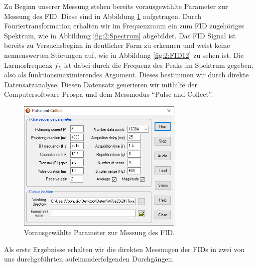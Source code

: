 \documentclass[../../main.tex]{subfiles}
\begin{document}
    Zu Beginn unserer Messung stehen bereits vorausgewählte Parameter zur Messung des FID. Diese sind in Abbildung \ref{fig:2:Parameter} aufgetragen. Durch Fouriertransformation erhalten wir im Frequenzraum ein zum FID zugehöriges Spektrum, wie in Abbildung \ref{fig:2:Spectrum} abgebildet. Das FID Signal ist bereits zu Versuchsbeginn in deutlicher Form zu erkennen und weist keine nennenswerten Störungen auf, wie in Abbildung \ref{fig:2:FID12} zu sehen ist. Die Larmorfrequenz $f_L$ ist dabei durch die Frequenz des Peaks im Spektrum gegeben, also als funktionsmaximierendes Argument. Dieses bestimmen wir durch direkte Datensatzanalyse. Diesen Datensatz generieren wir mithilfe der Computersoftware Prospa und dem Messmodus \enquote{Pulse and Collect}. 
    \begin{figure}[H]
        \centering
        \includegraphics[width=8cm]{Bilddateien/2/Exp1_Parameter.PNG}
        \caption{Vorausgewählte Parameter zur Messung des FID.}
        \label{fig:2:Parameter}
    \end{figure}
    Als erste Ergebnisse erhalten wir die direkten Messungen der FIDs in zwei von uns durchgeführten aufeinanderfolgenden Durchgängen.
\end{document}
